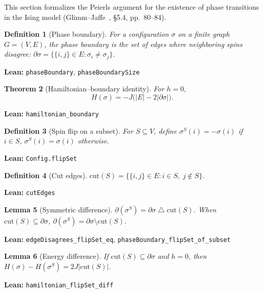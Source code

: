 \documentclass[a4paper,11pt]{article}
\newtheorem{theorem}{Theorem}
\newtheorem{lemma}[theorem]{Lemma}
\newtheorem{definition}[theorem]{Definition}
\begin{document}
This section formalizes the Peierls argument for the existence of phase
transitions in the Ising model (Glimm--Jaffe~\cite{glimm-jaffe}, \S5.4,
pp.~80--84).

\begin{definition}[Phase boundary]
For a configuration $\sigma$ on a finite graph $G = (V, E)$, the phase
boundary is the set of edges where neighboring spins disagree:
$\partial\sigma = \{ \{i,j\} \in E : \sigma_i \ne \sigma_j \}$.
\end{definition}

\noindent\textbf{Lean:} \texttt{phaseBoundary}, \texttt{phaseBoundarySize}

\begin{theorem}[Hamiltonian--boundary identity]
For $h = 0$,
\[
  H(\sigma) = -J \bigl(|E| - 2|\partial\sigma|\bigr).
\]
\end{theorem}

\noindent\textbf{Lean:} \texttt{hamiltonian\_boundary}

\begin{definition}[Spin flip on a subset]
For $S \subseteq V$, define $\sigma^S(i) = -\sigma(i)$ if $i \in S$,
$\sigma^S(i) = \sigma(i)$ otherwise.
\end{definition}

\noindent\textbf{Lean:} \texttt{Config.flipSet}

\begin{definition}[Cut edges]
$\mathrm{cut}(S) = \{ \{i,j\} \in E : i \in S,\; j \notin S \}$.
\end{definition}

\noindent\textbf{Lean:} \texttt{cutEdges}

\begin{lemma}[Symmetric difference]
$\partial(\sigma^S) = \partial\sigma \mathbin{\triangle} \mathrm{cut}(S)$.
When $\mathrm{cut}(S) \subseteq \partial\sigma$,
$\partial(\sigma^S) = \partial\sigma \setminus \mathrm{cut}(S)$.
\end{lemma}

\noindent\textbf{Lean:} \texttt{edgeDisagrees\_flipSet\_eq},
\texttt{phaseBoundary\_flipSet\_of\_subset}

\begin{lemma}[Energy difference]
If $\mathrm{cut}(S) \subseteq \partial\sigma$ and $h = 0$, then
$H(\sigma) - H(\sigma^S) = 2J|\mathrm{cut}(S)|$.
\end{lemma}

\noindent\textbf{Lean:} \texttt{hamiltonian\_flipSet\_diff}
\end{document}
